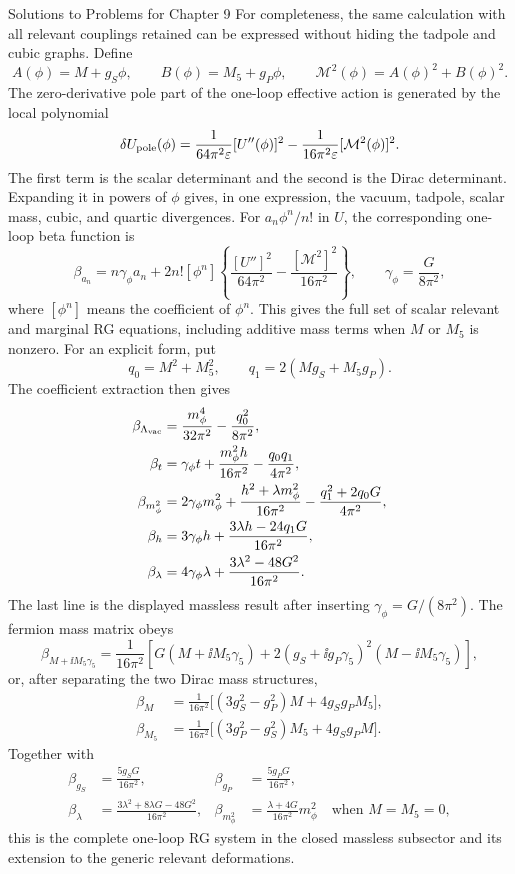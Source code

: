\begin{bankssolutions}{Solutions to Problems for Chapter 9}
For completeness, the same calculation with all relevant couplings retained
can be expressed without hiding the tadpole and cubic graphs.  Define
\[
 A(\phi)=M+g_S\phi,
 \qquad B(\phi)=M_5+g_P\phi,
 \qquad \mathcal M^2(\phi)=A(\phi)^2+B(\phi)^2 .
\]
The zero-derivative pole part of the one-loop effective action is generated
by the local polynomial
\begin{equation}
 \delta U_{\rm pole}(\phi)=\frac{1}{64\pi^2\varepsilon}[U''(\phi)]^2
 -\frac{1}{16\pi^2\varepsilon}[\mathcal M^2(\phi)]^2 .
 \label{eq:9.2-sol-potential-pole}
\end{equation}
The first term is the scalar determinant and the second is the Dirac
determinant.  Expanding it in powers of $\phi$ gives, in one expression,
the vacuum, tadpole, scalar mass, cubic, and quartic divergences.  For
$a_n\phi^n/n!$ in $U$, the corresponding one-loop beta function is
\[
 \beta_{a_n}=n\gamma_\phi a_n
 +2n! [\phi^n]\left\{
 \frac{[U'']^2}{64\pi^2}-\frac{[\mathcal M^2]^2}{16\pi^2}
 \right\},
 \qquad \gamma_\phi=\frac{G}{8\pi^2},
\]
where $[\phi^n]$ means the coefficient of $\phi^n$.  This gives the full
set of scalar relevant and marginal RG equations, including additive mass
terms when $M$ or $M_5$ is nonzero.  For an explicit form, put
\[
 q_0=M^2+M_5^2,\qquad q_1=2(Mg_S+M_5g_P).
\]
The coefficient extraction then gives
\begin{align*}
 \beta_{\Lambda_{\rm vac}}&=\frac{m_\phi^4}{32\pi^2}
 -\frac{q_0^2}{8\pi^2},\\
 \beta_t&=\gamma_\phi t+\frac{m_\phi^2h}{16\pi^2}
 -\frac{q_0q_1}{4\pi^2},\\
 \beta_{m_\phi^2}&=2\gamma_\phi m_\phi^2
 +\frac{h^2+\lambda m_\phi^2}{16\pi^2}
 -\frac{q_1^2+2q_0G}{4\pi^2},\\
 \beta_h&=3\gamma_\phi h
 +\frac{3\lambda h-24q_1G}{16\pi^2},\\
 \beta_\lambda&=4\gamma_\phi\lambda
 +\frac{3\lambda^2-48G^2}{16\pi^2}.
\end{align*}
The last line is the displayed massless result after inserting
$\gamma_\phi=G/(8\pi^2)$.  The fermion mass matrix obeys
\[
 \beta_{M+\ii M_5\gamma _5}
 =\frac{1}{16\pi^2}\left[G(M+\ii M_5\gamma _5)
 +2(g_S+\ii g_P\gamma _5)^2(M-\ii M_5\gamma _5)\right],
\]
or, after separating the two Dirac mass structures,
\begin{align*}
 \beta_M&=\frac{1}{16\pi^2}
 \bigl[(3g_S^2-g_P^2)M+4g_Sg_PM_5\bigr],\\
 \beta_{M_5}&=\frac{1}{16\pi^2}
 \bigl[(3g_P^2-g_S^2)M_5+4g_Sg_PM\bigr].
\end{align*}
Together with
\begin{align*}
 \beta_{g_S}&=\frac{5g_SG}{16\pi^2},
 &\beta_{g_P}&=\frac{5g_PG}{16\pi^2},\\
 \beta_\lambda&=\frac{3\lambda^2+8\lambda G-48G^2}{16\pi^2},
 &\beta_{m_\phi^2}&=\frac{\lambda+4G}{16\pi^2}m_\phi^2
 \quad\text{when }M=M_5=0,
\end{align*}
this is the complete one-loop RG system in the closed massless subsector and
its extension to the generic relevant deformations.


\end{bankssolutions}
